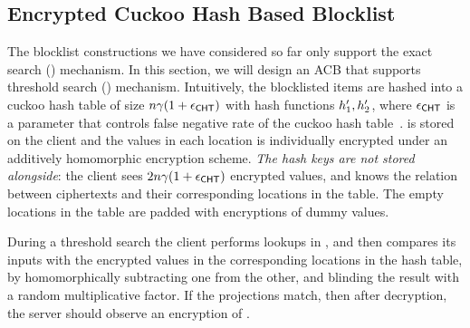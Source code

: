 \subsection{Encrypted Cuckoo Hash Based Blocklist}
%
The blocklist constructions we have considered so far only support the exact search (\searchBlocklist) mechanism. In this section, we will design an ACB that supports threshold search (\thresholdSearchBlocklist) mechanism. Intuitively, the blocklisted items are hashed into a cuckoo hash table \cuckooTable of size $n \gamma(1+\epsilon_{\mathsf{CHT}})$ with hash functions $\cuckooHashFn{1}, \cuckooHashFn{2}$, where $\epsilon_{\mathsf{CHT}}$ is a parameter that controls false negative rate of the cuckoo hash table~\cite{bhowmick2021apple}. \cuckooTable is stored on the client and the values in each location is individually encrypted under an additively homomorphic encryption scheme. \emph{The hash keys are not stored alongside}: the client sees $2 n \gamma(1+\epsilon_{\mathsf{CHT}})$ encrypted values, and knows the relation between ciphertexts and their corresponding locations in the table. The empty locations in the table are padded with encryptions of dummy values. 


During a threshold search the client performs lookups in \cuckooTable, and then compares its inputs with the encrypted values in the corresponding locations in the hash table, by homomorphically subtracting one from the other, and blinding the result with a random multiplicative factor. If the projections match, then after decryption, the server should observe an encryption of \groupIdentity. 

